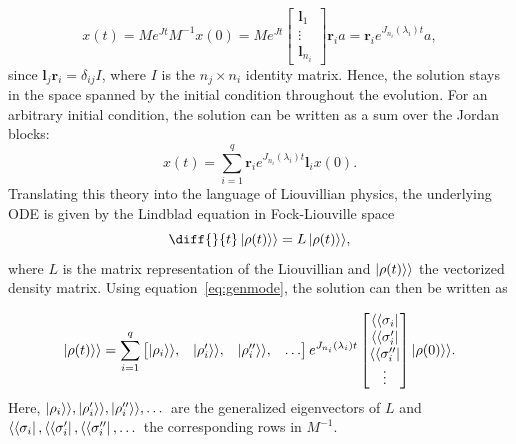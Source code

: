 \documentclass[../main.tex]{subfiles}
\begin{document}
\begin{equation}\label{eq:genmode}
    x(t) = Me^{Jt}M^{-1}x(0) = Me^{Jt} \begin{bmatrix} \boldsymbol{l}_1 \\ \vdots \\ \boldsymbol{l}_{n_i} \end{bmatrix} \boldsymbol{r}_ia = \boldsymbol{r}_i e^{J_{n_i}(\lambda_i)t} a,
\end{equation}
since $\boldsymbol{l}_j\boldsymbol{r}_i = \delta_{ij}I$, where $I$ is the $n_j\times n_i$ identity matrix. Hence, the solution stays in the space spanned by the initial condition throughout the evolution. For an arbitrary initial condition, the solution can be written as a sum over the Jordan blocks: 
\begin{equation}
    x(t) = \sum_{i=1}^q \boldsymbol{r}_i e^{J_{n_i}(\lambda_i)t} \boldsymbol{l}_i x(0).
\end{equation}
Translating this theory into the language of Liouvillian physics, the underlying ODE is given by the Lindblad equation in Fock-Liouville space    
\begin{equation}
    \diff{}{t}\ket{\rho(t)}\rangle = L \ket{\rho(t)}\rangle,
\end{equation}
where $L$ is the matrix representation of the Liouvillian and $\ket{\rho(t)}\rangle$ the vectorized density matrix. Using equation~\eqref{eq:genmode}, the solution can then be written as

\begin{equation}\label{eq:genmodeFL}
    \ket{\rho(t)}\rangle = \sum_{i=1}^q \begin{bmatrix} \ket{\rho_i}\rangle, & \ket{\rho_i'}\rangle, & \ket{\rho_i''}\rangle, & \dots \end{bmatrix} e^{J_{n_i}(\lambda_i)t} \begin{bmatrix} \langle\bra{\sigma_i} \\ \langle\bra{\sigma_i'}\\ \langle\bra{\sigma_i'' } \\ \vdots \end{bmatrix}\ket{\rho(0)}\rangle.
\end{equation}
Here, $\ket{\rho_i}\rangle, \ket{\rho_i'}\rangle, \ket{\rho_i''}\rangle, \dots$ are the generalized eigenvectors of $L$ and $\langle\bra{\sigma_i}, \langle\bra{\sigma_i'}, \langle\bra{\sigma_i'' }, \dots$ the corresponding rows in $M^{-1}$.
\end{document}
